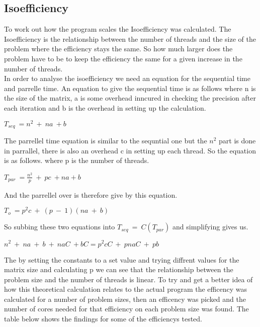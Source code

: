 \documentclass{article}
\begin{document}
\subsection{Isoefficiency}

To work out how the program scales the Isoefficiency was calculated. The Isoefficiency
is the relationship between the number of threads and the size of the problem where the
efficiency stays the same. So how much larger does the problem have to be to keep the
efficiency the same for a given increase in the number of threads.\\
In order to analyse the isoefficiency we need an equation for the sequential time
and parrelle time. An equation to give the sequential time is as follows where
n is the size of the matrix, a is some overhead inncured in checking the precision
after each iteration and b is the overhead in setting up the calculation.

\begin{center}
$T_{seq}\ =n^2\ +\ na\ + b$
\end{center}

The parrellel time equation is similar to the sequntial one but the $n^2$ part is done
in parrallel, there is also an overhead c in setting up each thread. So the equation
is as follows. where p is the number of threads.

\begin{center}
$T_{par}\ =\frac{n^2}{p}\ +\ pc\ + na + b$
\end{center}

And the parrellel over is therefore give by this equation.

\begin{center}
$T_{o}\ =p^2c\ +\ (p\ -\ 1)(na\ +\ b)$
\end{center}

So subbing these two equations into $T_{seq}\ =\ C(T_{par})$ and simplifying gives
us.

$n^2\ +\ na\ +\ b\ +\ naC\ +bC = p^2cC\ +\ pnaC\ +\ pb$

The by setting the constants to a set value and trying diffrent values for the
matrix size and calculating p we can see that the relationship between the problem
size and the number of threads is linear. To try and get a better idea of how this
theoretical calculation relates to the actual program the efficency was calculated
for a number of problem sizes, then an efficency was picked and the number of cores
needed for that efficiency on each problem size was found. The table below shows the
findings for some of the efficiencys tested.
\end{document}
